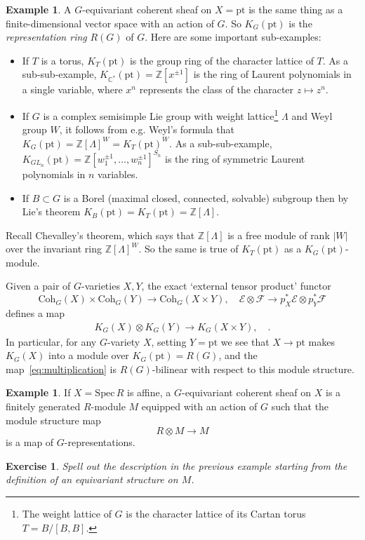 \documentclass[11pt]{amsart}
\newtheorem{exercise}[dummy]{Exercise}
\theoremstyle{definition}
\newtheorem{example}[dummy]{Example}
\newcommand{\bZ}{\mathbb{Z}}
\newcommand{\Ec}{\mathcal{E}}
\newcommand{\Fc}{\mathcal{F}}
\newcommand{\Spec}{\mathrm{Spec}\,}
\newcommand{\Coh}{\mathrm{Coh}}
\numberwithin{equation}{subsection}
\numberwithin{figure}{subsection}
\newcommand{\pt}{\mathrm{pt}}
\begin{document}
\begin{example}
\label{eg:kpoint}
A $G$-equivariant coherent sheaf on $X=\pt$ is the same thing as a finite-dimensional vector space with an action of $G$. So $K_G(\pt)$ is the \emph{representation ring} $R(G)$ of $G$. Here are some important sub-examples: 
\begin{itemize}
\item If $T$ is a torus, $K_T(\pt)$ is the group ring of the character lattice of $T$. As a sub-sub-example, $K_{\mathbb{C}^*}(\pt)=\mathbb{Z}[x^{\pm1}]$ is the ring of Laurent polynomials in a single variable, where $x^n$ represents the class of the character $z\mapsto z^n$.

\item If $G$ is a complex semisimple Lie group with weight lattice\footnote{The weight lattice of $G$ is the character lattice of its Cartan torus $T=B/[B,B]$.} $\Lambda$  and Weyl group $W$, it follows from e.g. Weyl's formula that $K_G(\pt)=\mathbb{Z}[\Lambda]^W=K_T(\pt)^W$. As a sub-sub-example, $K_{GL_n}(\pt)=\bZ[w_1^{\pm1},\ldots,w_n^{\pm1}]^{S_n}$ is the ring of symmetric Laurent polynomials in $n$ variables.
\item If $B\subset G$ is a Borel (maximal closed, connected, solvable) subgroup then by Lie's theorem $K_B(\pt)=K_T(\pt)=\bZ[\Lambda]$.
\end{itemize}
Recall Chevalley's theorem, which says that $\bZ[\Lambda]$ is a free module of rank $|W|$ over the invariant ring $\bZ[\Lambda]^W$. So the same is true of $K_T(\pt)$ as a $K_G(\pt)$-module. 
\end{example}

Given a pair of $G$-varieties $X,Y$, the exact `external tensor product' functor 
$$
\Coh_G(X)\times \Coh_G(Y)\rightarrow \Coh_G(X\times Y),\quad \Ec\otimes\Fc \rightarrow p_X^*\Ec\otimes p_Y^*\Fc
$$ defines a map
\begin{align}
\label{eq:multiplication}
K_G(X)\otimes K_G(Y)\rightarrow K_G(X\times Y),\quad .
\end{align}
In particular, for any $G$-variety $X$, setting $Y=\pt$ we see that $X\rightarrow \pt$ makes $K_G(X)$ into a module over $K_G(\pt)= R(G)$,  and the map~\eqref{eq:multiplication} is $R(G)$-bilinear with respect to this module structure.

\begin{example}
If $X=\Spec R$ is affine, a $G$-equivariant coherent sheaf on $X$ is a finitely generated $R$-module $M$ equipped with an action of $G$ such that the module structure map
$$
R\otimes M \rightarrow M
$$
is a map of $G$-representations.
\end{example}
\begin{exercise}
Spell out the description in the previous example starting from the definition of an equivariant structure on $M$.
\end{exercise}
\end{document}
